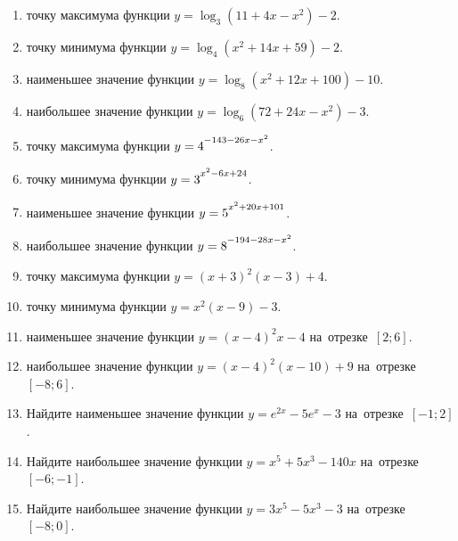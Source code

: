 \documentclass[a4paper,10pt]{article}
\begin{document}
\begin{enumerate}
\item {} точку максимума функции $y=\log_3\left(11+4x-x^2\right)-2$.

\item {} точку минимума функции $y=\log_4\left(x^2+14x+59\right)-2$.

\item {} наименьшее значение функции $y=\log_8\left(x^2+12x+100\right)-10$.

\item {} наибольшее значение функции $y=\log_6\left(72+24x-x^2\right)-3$.

\item {} точку максимума функции $y=4\strut^{-143-26x-x^2}$.

\item {} точку минимума функции $y=3\strut^{x^2-6x+24}$.

\item {} наименьшее значение функции $y=5\strut^{x^2+20x+101}$.

\item {} наибольшее значение функции $y=8\strut^{-194-28x-x^2}$.

\item {} точку максимума функции $y=\left(x+3\right)^2\left(x-3\right)+4$.

\item {} точку минимума функции $y=x^2\left(x-9\right)-3$.

\item {} наименьшее значение функции $y=\left(x-4\right)^2x-4$ на~отрезке~$\left[2;6\right]$.

\item {} наибольшее значение функции $y=\left(x-4\right)^2\left(x-10\right)+9$ на~отрезке~$\left[-8;6\right]$.

\item Найдите наименьшее значение функции $y=e^{2x}-5e^x-3$ на~отрезке~$\left[-1;2\right]$.

\item Найдите наибольшее значение функции $y=x^5+5x^3-140x$ на~отрезке~$\left[-6;-1\right]$.

\item Найдите наибольшее значение функции $y=3x^5-5x^3-3$ на~отрезке~$\left[-8;0\right]$.

\end{enumerate}
\end{document}
